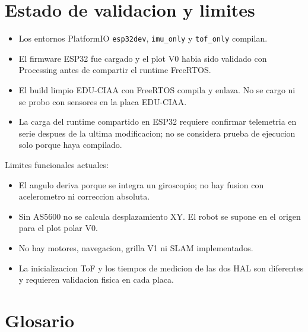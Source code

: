 \documentclass[11pt,a4paper]{article}
\begin{document}
\section{Estado de validacion y limites}

\begin{itemize}
  \item Los entornos PlatformIO \texttt{esp32dev}, \texttt{imu\_only} y
        \texttt{tof\_only} compilan.
  \item El firmware ESP32 fue cargado y el plot V0 habia sido validado con
        Processing antes de compartir el runtime FreeRTOS.
  \item El build limpio EDU-CIAA con FreeRTOS compila y enlaza. No se cargo ni
        se probo con sensores en la placa EDU-CIAA.
      \item La carga del runtime compartido en ESP32 requiere confirmar telemetria
        en serie despues de la ultima modificacion; no se considera prueba de
        ejecucion solo porque haya compilado.
\end{itemize}

Limites funcionales actuales:

\begin{itemize}
  \item El angulo deriva porque se integra un giroscopio; no hay fusion con
        acelerometro ni correccion absoluta.
  \item Sin AS5600 no se calcula desplazamiento XY. El robot se supone en el
        origen para el plot polar V0.
  \item No hay motores, navegacion, grilla V1 ni SLAM implementados.
  \item La inicializacion ToF y los tiempos de medicion de las dos HAL son
        diferentes y requieren validacion fisica en cada placa.
\end{itemize}

\section{Glosario}
\end{document}
